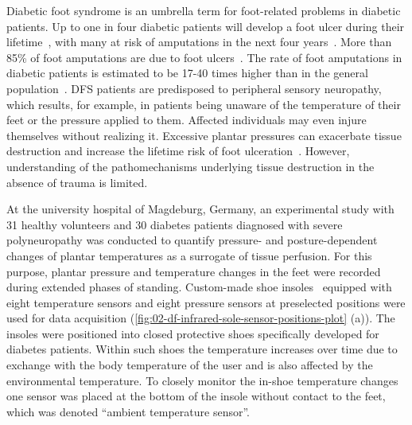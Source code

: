 \documentclass[
  oneside]{book}
\begin{document}
Diabetic foot syndrome is an umbrella term for foot-related problems in diabetic patients.
Up to one in four diabetic patients will develop a foot ulcer during their lifetime~\autocite{RN1}, with many at risk of amputations in the next four years~\autocite{RN2}.
More than 85\% of foot amputations are due to foot ulcers~\autocite{RN3,RN4}.
The rate of foot amputations in diabetic patients is estimated to be 17-40 times higher than in the general population~\autocite{fard2007assessment}.
DFS patients are predisposed to peripheral sensory neuropathy, which results, for example, in patients being unaware of the temperature of their feet or the pressure applied to them.
Affected individuals may even injure themselves without realizing it.
Excessive plantar pressures can exacerbate tissue destruction and increase the lifetime risk of foot ulceration~\autocite{SinghEtAl:PreventingFootUlcers2005}.
However, understanding of the pathomechanisms underlying tissue destruction in the absence of trauma is limited.

At the university hospital of Magdeburg, Germany, an experimental study with 31 healthy volunteers and 30 diabetes patients diagnosed with severe polyneuropathy was conducted to quantify pressure- and posture-dependent changes of plantar temperatures as a surrogate of tissue perfusion.
For this purpose, plantar pressure and temperature changes in the feet were recorded during extended phases of standing.
Custom-made shoe insoles~\autocite{GruetznerEtAl:SmartDiabeticInsole2015} equipped with eight temperature sensors and eight pressure sensors at preselected positions were used for data acquisition (\ref{fig:02-df-infrared-sole-sensor-positions-plot} (a)).
The insoles were positioned into closed protective shoes specifically developed for diabetes patients.
Within such shoes the temperature increases over time due to exchange with the body temperature of the user and is also affected by the environmental temperature.
To closely monitor the in-shoe temperature changes one sensor was placed at the bottom of the insole without contact to the feet, which was denoted ``ambient temperature sensor''.
\end{document}
